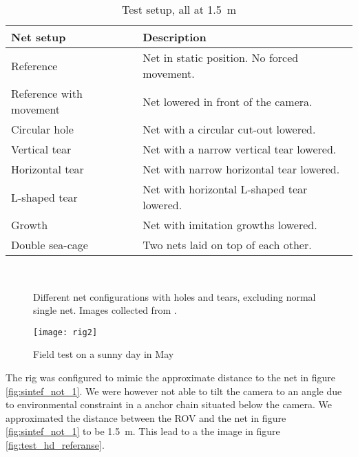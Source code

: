\begin{table}[htbp]
	\centering
	\begin{tabular}{ll}
		\toprule
			Net setup 					& Description  \\
		\midrule
			Reference					& Net in static position. No forced movement. \\
			Reference with movement		& Net lowered in front of the camera. \\
			Circular hole				& Net with a circular cut-out lowered. \\
			Vertical tear				& Net with a narrow vertical tear lowered. \\
			Horizontal tear				& Net with narrow horizontal tear lowered. \\
			L-shaped tear				& Net with horizontal L-shaped tear lowered. \\
			Growth						& Net with imitation growths lowered.\\
			Double sea-cage				& Two nets laid on top of each other.\\
		\bottomrule
	\end{tabular}
	\caption{Test setup, all at \SI{1.5}{\metre}}
	\label{tbl:test_setup}
\end{table}

\begin{figure}[htbp]
    \centering
     \hfill
     \hfill
    \\
	 \hfill
	\caption{Different net configurations with holes and tears, excluding normal single net. Images collected from \citet{sletta13}.}
	\label{fig:net_configs}
\end{figure}

\begin{figure}[htbp]
	\centering
	\texttt{[image: rig2]}
	\caption{Field test on a sunny day in May}
	\label{fig:test_hd}
\end{figure}

The rig was configured to mimic the approximate distance to the net 
in figure \vref{fig:sintef_not_1}. We were however not able to tilt the camera to 
an angle due to environmental constraint in a anchor chain situated below the camera.
We approximated the distance between the ROV and the net in figure \vref{fig:sintef_not_1} to be 
\SI{1.5}{\metre}. This lead to a the image in figure \vref{fig:test_hd_referanse}.

